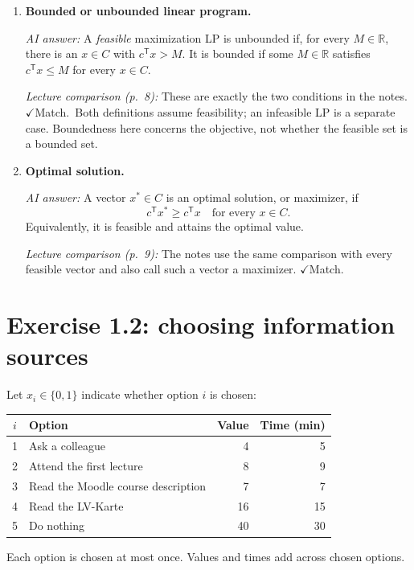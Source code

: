 \documentclass[11pt,a4paper]{article}
\newcommand{\match}{\(\checkmark\)\;Match.}
\begin{document}
\begin{enumerate}[leftmargin=*,itemsep=10pt]
\textit{AI answer:} For a maximization LP, the optimal value is
\[
\gamma=\sup\{c^{\mathsf T}x:x\in C\}\in\mathbb R\cup\{-\infty,+\infty\},
\qquad \sup\varnothing=-\infty.
\]
Thus an infeasible LP has value $-\infty$, a feasible unbounded LP has value $+\infty$, and a feasible bounded LP has a finite real optimal value.

\textit{Lecture comparison (pp.~8--9):} The notes use this supremum and the same empty-set convention, then list these three cases. \match\ The supremum definition does not itself assert that a maximizer exists.
\item \textbf{Bounded or unbounded linear program.}

\textit{AI answer:} A \emph{feasible} maximization LP is unbounded if, for every $M\in\mathbb R$, there is an $x\in C$ with $c^{\mathsf T}x>M$. It is bounded if some $M\in\mathbb R$ satisfies $c^{\mathsf T}x\leq M$ for every $x\in C$.

\textit{Lecture comparison (p.~8):} These are exactly the two conditions in the notes. \match\ Both definitions assume feasibility; an infeasible LP is a separate case. Boundedness here concerns the objective, not whether the feasible set is a bounded set.
\item \textbf{Optimal solution.}

\textit{AI answer:} A vector $x^*\in C$ is an optimal solution, or maximizer, if
\[
c^{\mathsf T}x^*\geq c^{\mathsf T}x\quad\text{for every }x\in C.
\]
Equivalently, it is feasible and attains the optimal value.

\textit{Lecture comparison (p.~9):} The notes use the same comparison with every feasible vector and also call such a vector a maximizer. \match
\end{enumerate}
\newpage
\section*{Exercise 1.2: choosing information sources}
Let $x_i\in\{0,1\}$ indicate whether option $i$ is chosen:
\begin{center}
\begin{tabular}{clrr}
$i$ & Option & Value & Time (min)\\\hline
1 & Ask a colleague & 4 & 5\\
2 & Attend the first lecture & 8 & 9\\
3 & Read the Moodle course description & 7 & 7\\
4 & Read the LV-Karte & 16 & 15\\
5 & Do nothing & 40 & 30
\end{tabular}
\end{center}
Each option is chosen at most once. Values and times add across chosen options.
\end{document}
